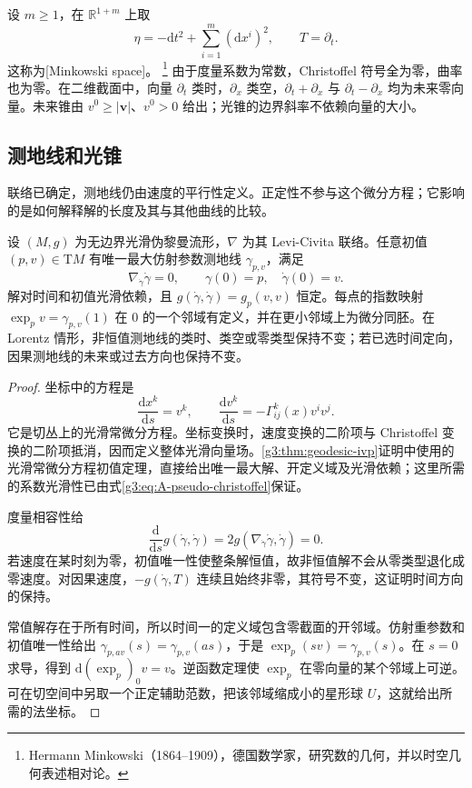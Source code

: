 \begin{example}\label{g3:exm:A-minkowski-model}
	设 \(m\ge1\)，在 \(\mathbb R^{1+m}\) 上取
	\[
		\eta=-\mathrm dt^2+\sum_{i=1}^m(\mathrm dx^i)^2,
		\qquad T=\partial_t.
	\]
	这称为[Minkowski space]。%
	\footnote{Hermann Minkowski（1864--1909），德国数学家，研究数的几何，并以时空几何表述相对论。}
	由于度量系数为常数，Christoffel 符号全为零，曲率也为零。在二维截面中，向量 \(\partial_t\) 类时，\(\partial_x\) 类空，\(\partial_t+\partial_x\) 与 \(\partial_t-\partial_x\) 均为未来零向量。未来锥由 \(v^0\ge|\mathbf v|\)、\(v^0>0\) 给出；光锥的边界斜率不依赖向量的大小。
\end{example}

\subsection{测地线和光锥}
\label{g3:subsec:A01:03}

联络已确定，测地线仍由速度的平行性定义。正定性不参与这个微分方程；它影响的是如何解释解的长度及其与其他曲线的比较。

\begin{proposition}\label{g3:prop:A-geodesics-exponential}
	设 \((M,g)\) 为无边界光滑伪黎曼流形，\(\nabla\) 为其 Levi-Civita 联络。任意初值 \((p,v)\in\mathrm TM\) 有唯一最大仿射参数测地线 \(\gamma_{p,v}\)，满足
	\[
		\nabla_{\dot\gamma}\dot\gamma=0,\qquad
		\gamma(0)=p,\quad\dot\gamma(0)=v.
	\]
	解对时间和初值光滑依赖，且 \(g(\dot\gamma,\dot\gamma)=g_p(v,v)\) 恒定。每点的指数映射
	\(\exp_pv=\gamma_{p,v}(1)\) 在 \(0\) 的一个邻域有定义，并在更小邻域上为微分同胚。在 Lorentz 情形，非恒值测地线的类时、类空或零类型保持不变；若已选时间定向，因果测地线的未来或过去方向也保持不变。
\end{proposition}
\begin{proof}
	坐标中的方程是
	\[
		\frac{\mathrm dx^k}{\mathrm ds}=v^k,\qquad
		\frac{\mathrm dv^k}{\mathrm ds}
		=-\Gamma^k_{ij}(x)v^iv^j.
	\]
	它是切丛上的光滑常微分方程。坐标变换时，速度变换的二阶项与 Christoffel 变换的二阶项抵消，因而定义整体光滑向量场。\cref{g3:thm:geodesic-ivp}证明中使用的光滑常微分方程初值定理，直接给出唯一最大解、开定义域及光滑依赖；这里所需的系数光滑性已由式\eqref{g3:eq:A-pseudo-christoffel}保证。

	度量相容性给
	\[
		\frac{\mathrm d}{\mathrm ds}g(\dot\gamma,\dot\gamma)
		=2g(\nabla_{\dot\gamma}\dot\gamma,\dot\gamma)=0.
	\]
	若速度在某时刻为零，初值唯一性使整条解恒值，故非恒值解不会从零类型退化成零速度。对因果速度，\(-g(\dot\gamma,T)\) 连续且始终非零，其符号不变，这证明时间方向的保持。

	常值解存在于所有时间，所以时间一的定义域包含零截面的开邻域。仿射重参数和初值唯一性给出
	\(\gamma_{p,av}(s)=\gamma_{p,v}(as)\)，于是
	\(\exp_p(sv)=\gamma_{p,v}(s)\)。在 \(s=0\) 求导，得到
	\(\mathrm d(\exp_p)_0v=v\)。逆函数定理使 \(\exp_p\) 在零向量的某个邻域上可逆。可在切空间中另取一个正定辅助范数，把该邻域缩成小的星形球 \(U\)，这就给出所需的法坐标。
\end{proof}

